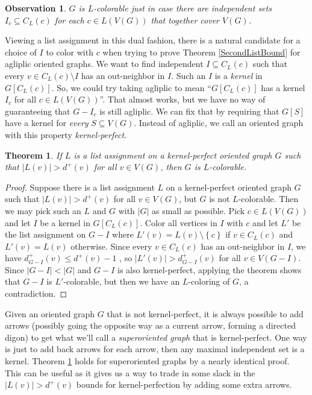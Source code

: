 \documentclass[openany]{tufte-book} %
\theoremstyle{plain}
\newtheorem{observation}{Observation}
\newtheorem{theorem}{Theorem}
\newcommand{\set}[1]{\left\{ #1 \right\}}
\newcommand{\card}[1]{\left|#1\right|}
\newcommand{\brackets}[1]{\left[ #1 \right]}
\begin{document}
\begin{observation}
$G$ is $L$-colorable just in case there are independent sets $I_c \subseteq C_L(c)$ for each $c \in L(V(G))$ that together cover $V(G)$.
\end{observation}

Viewing a list assignment in this dual fashion, there is a natural candidate for a choice of $I$ to color with $c$ when trying to prove Theorem \ref{SecondListBound} for agliplic oriented graphs.
We want to find independent $I \subseteq C_L(c)$ such that every $v \in C_L(c) \setminus I$ has an out-neighbor in $I$.  Such an $I$ is a \emph{kernel} in $G\brackets{C_L(c)}$.  
So, we could try taking agliplic to mean ``$G\brackets{C_L(c)}$ has a kernel $I_c$ for all $c \in L(V(G))$''.  
That almost works, but we have no way of guaranteeing that $G-I_c$ is still agliplic.  We can fix that by requiring that $G[S]$ have a kernel for \emph{every} $S\subseteq V(G)$.  
Instead of agliplic, we call an oriented graph with this property \emph{kernel-perfect}.

\begin{theorem}\label{KernelPerfectListBound}
If $L$ is a list assignment on a kernel-perfect oriented graph $G$ such that $\card{L(v)} > d^+(v)$ for all $v \in V(G)$, then $G$ is $L$-colorable.
\end{theorem}
\begin{proof}
Suppose there is a list assignment $L$ on a kernel-perfect oriented graph $G$ such that $\card{L(v)} > d^+(v)$ for all $v \in V(G)$, but $G$ is not $L$-colorable.  Then
we may pick such an $L$ and $G$ with $\card{G}$ as small as possible.  Pick $c \in L(V(G))$ and let $I$ be a kernel in $G\brackets{C_L(c)}$.  Color all vertices in $I$ with $c$
and let $L'$ be the list assignment on $G-I$ where $L'(v) = L(v) \setminus \set{c}$ if $v \in C_L(c)$ and $L'(v) = L(v)$ otherwise.  
Since every $v \in C_L(c)$ has an out-neighbor in $I$, we have $d_{G-I}^+(v) \le d^+(v) - 1$ , so 
$\card{L'(v)} > d_{G-I}^+(v)$ for all $v \in V(G-I)$.  Since $\card{G-I} < \card{G}$ and $G-I$ is also kernel-perfect, applying the theorem shows that $G-I$ is $L'$-colorable, 
but then we have an $L$-coloring of $G$, a contradiction.
\end{proof}

Given an oriented graph $G$ that is not kernel-perfect, it is always possible to add arrows (possibly going the opposite way as a current arrow, forming a directed digon) 
to get what we'll call a \emph{superoriented graph} that is kernel-perfect.  One way is just to add back arrows for each arrow, then any maximal independent set is a kernel.
Theorem \ref{KernelPerfectListBound} holds for superoriented graphs by a nearly identical proof.  
This can be useful as it gives us a way to trade in some slack in the $\card{L(v)} > d^+(v)$ bounds for kernel-perfection by adding some extra arrows.
\end{document}
